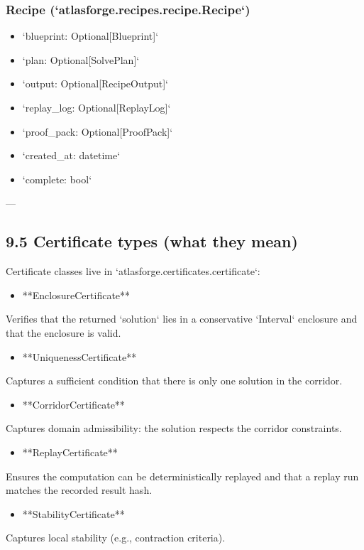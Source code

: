 \documentclass[11pt]{article}
\begin{document}
\subsubsection{Recipe (`atlasforge.recipes.recipe.Recipe`)}
\begin{itemize}
\item `blueprint: Optional[Blueprint]`
\item `plan: Optional[SolvePlan]`
\item `output: Optional[RecipeOutput]`
\item `replay\_log: Optional[ReplayLog]`
\item `proof\_pack: Optional[ProofPack]`
\item `created\_at: datetime`
\item `complete: bool`
\end{itemize}

---

\subsection{9.5 Certificate types (what they mean)}

Certificate classes live in `atlasforge.certificates.certificate`:

\begin{itemize}
\item **EnclosureCertificate**
\end{itemize}
  Verifies that the returned `solution` lies in a conservative `Interval` enclosure and that the enclosure is valid.

\begin{itemize}
\item **UniquenessCertificate**
\end{itemize}
  Captures a sufficient condition that there is only one solution in the corridor.

\begin{itemize}
\item **CorridorCertificate**
\end{itemize}
  Captures domain admissibility: the solution respects the corridor constraints.

\begin{itemize}
\item **ReplayCertificate**
\end{itemize}
  Ensures the computation can be deterministically replayed and that a replay run matches the recorded result hash.

\begin{itemize}
\item **StabilityCertificate**
\end{itemize}
  Captures local stability (e.g., contraction criteria).
\end{document}
